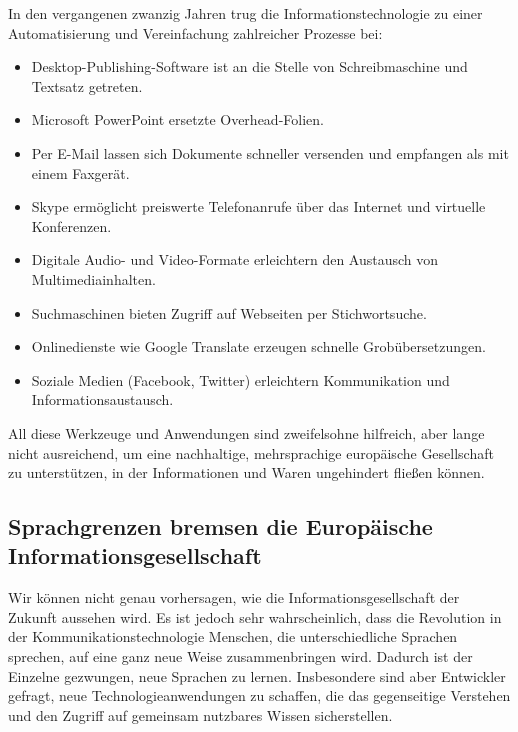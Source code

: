 \documentclass[]{../../metanetpaper}
\begin{document}
\begin{multicols}{2}
In den vergangenen zwanzig Jahren trug die Informationstechnologie zu einer Automatisierung und Vereinfachung zahlreicher Prozesse bei:

\begin{itemize}
\item Desktop-Publishing-Software ist an die Stelle von Schreibmaschine und Textsatz getreten.
\item Microsoft PowerPoint ersetzte Overhead-Folien.
\item Per E-Mail lassen sich Dokumente schneller versenden und empfangen als mit einem Faxgerät.
\item Skype ermöglicht preiswerte Telefonanrufe über das Internet und virtuelle Konferenzen.
\item Digitale Audio- und Video-Formate erleichtern den Austausch von Multimediainhalten.
\item Suchmaschinen bieten Zugriff auf Webseiten per Stichwortsuche.
\item Onlinedienste wie Google Translate erzeugen schnelle Grobübersetzungen.
\item Soziale Medien (Facebook, Twitter) erleichtern Kommunika\-tion und  Informationsaustausch.
\end{itemize}

All diese Werkzeuge und Anwendungen sind zweifelsohne hilfreich, aber lange nicht ausreichend, um eine nachhaltige, mehrsprachige europäische Gesellschaft zu unterstützen, in der Informationen und Waren ungehindert fließen können.

\subsection{Sprachgrenzen bremsen die Europäische Informations\-ge\-sell\-schaft}
  
Wir können nicht genau vorhersagen, wie die Informationsgesellschaft der Zukunft aussehen wird. Es ist jedoch sehr wahrscheinlich, dass die Revolution in der Kommunikationstechnologie Menschen, die unterschiedliche Sprachen sprechen, auf eine ganz neue Weise zusammenbringen wird. Dadurch ist der Einzelne gezwungen, neue Sprachen zu lernen. Insbesondere sind aber Entwickler gefragt, neue Technologieanwendungen zu schaffen, die das gegenseitige Verstehen und den Zugriff auf gemeinsam nutzbares Wissen sicherstellen.



\end{multicols}
\end{document}
